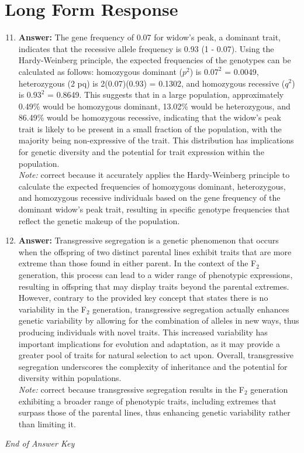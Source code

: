 \documentclass[12pt]{article}
\begin{document}
\section*{Long Form Response}
\begin{enumerate}[label=\arabic*.]
\setcounter{enumi}{10}
\item \textbf{Answer:} The gene frequency of 0.07 for widow's peak, a dominant trait, indicates that the recessive allele frequency is 0.93 (1 - 0.07). Using the Hardy-Weinberg principle, the expected frequencies of the genotypes can be calculated as follows: homozygous dominant ($p^2$) is 0.$07^2$ = 0.0049, heterozygous (2 pq) is 2(0.07)(0.93) = 0.1302, and homozygous recessive ($q^2$) is 0.$93^2$ = 0.8649. This suggests that in a large population, approximately 0.49\% would be homozygous dominant, 13.02\% would be heterozygous, and 86.49\% would be homozygous recessive, indicating that the widow's peak trait is likely to be present in a small fraction of the population, with the majority being non-expressive of the trait. This distribution has implications for genetic diversity and the potential for trait expression within the population.
\\ \textit{Note:} correct because it accurately applies the Hardy-Weinberg principle to calculate the expected frequencies of homozygous dominant, heterozygous, and homozygous recessive individuals based on the gene frequency of the dominant widow's peak trait, resulting in specific genotype frequencies that reflect the genetic makeup of the population.
\item \textbf{Answer:} Transgressive segregation is a genetic phenomenon that occurs when the offspring of two distinct parental lines exhibit traits that are more extreme than those found in either parent. In the context of the F$_{2}$ generation, this process can lead to a wider range of phenotypic expressions, resulting in offspring that may display traits beyond the parental extremes. However, contrary to the provided key concept that states there is no variability in the F$_{2}$ generation, transgressive segregation actually enhances genetic variability by allowing for the combination of alleles in new ways, thus producing individuals with novel traits. This increased variability has important implications for evolution and adaptation, as it may provide a greater pool of traits for natural selection to act upon. Overall, transgressive segregation underscores the complexity of inheritance and the potential for diversity within populations.
\\ \textit{Note:} correct because transgressive segregation results in the F$_{2}$ generation exhibiting a broader range of phenotypic traits, including extremes that surpass those of the parental lines, thus enhancing genetic variability rather than limiting it.
\end{enumerate}

\vfill
\noindent\textit{End of Answer Key}
\end{document}
